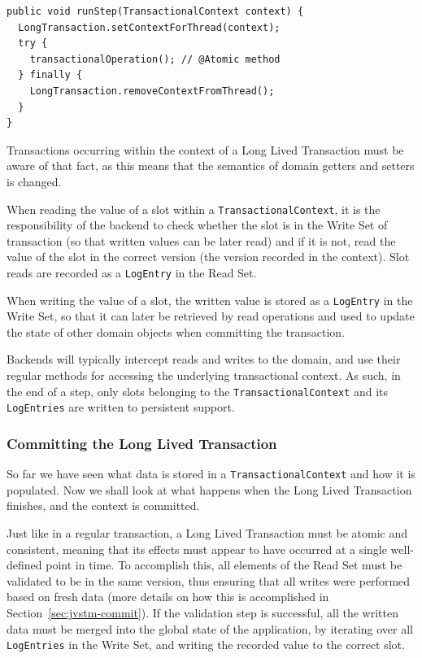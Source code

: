 \documentclass{llncs}
\begin{document}
\begin{lstlisting}[caption={Example of TransactionalContext usage},
  label={list:longTxBind},float]
public void runStep(TransactionalContext context) {
  LongTransaction.setContextForThread(context);
  try {
    transactionalOperation(); // @Atomic method
  } finally {
    LongTransaction.removeContextFromThread();
  }
}
\end{lstlisting}

Transactions occurring within the context of a Long Lived Transaction
must be aware of that fact, as this means that the semantics of domain
getters and setters is changed.

When reading the value of a slot within a
\texttt{TransactionalContext}, it is the responsibility of the backend
to check whether the slot is in the Write Set of transaction (so that
written values can be later read) and if it is not, read the value of
the slot in the correct version (the version recorded in the
context). Slot reads are recorded as a \texttt{LogEntry} in the Read
Set.

When writing the value of a slot, the written value is stored as a
\texttt{LogEntry} in the Write Set, so that it can later be retrieved
by read operations and used to update the state of other domain
objects when committing the transaction.

Backends will typically intercept reads and writes to the domain, and
use their regular methods for accessing the underlying transactional
context. As such, in the end of a step, only slots belonging to the
\texttt{TransactionalContext} and its \texttt{LogEntries} are written
to persistent support.

\subsubsection{Committing the Long Lived Transaction}

So far we have seen what data is stored in a
\texttt{TransactionalContext} and how it is populated. Now we shall
look at what happens when the Long Lived Transaction finishes, and the
context is committed.

Just like in a regular transaction, a Long Lived Transaction must be
atomic and consistent, meaning that its effects must appear to have
occurred at a single well-defined point in time. To accomplish this,
all elements of the Read Set must be validated to be in the same
version, thus ensuring that all writes were performed based on fresh
data (more details on how this is accomplished in
Section~\ref{sec:jvstm-commit}). If the validation step is successful,
all the written data must be merged into the global state of the
application, by iterating over all \texttt{LogEntries} in the Write
Set, and writing the recorded value to the correct slot.
\end{document}
